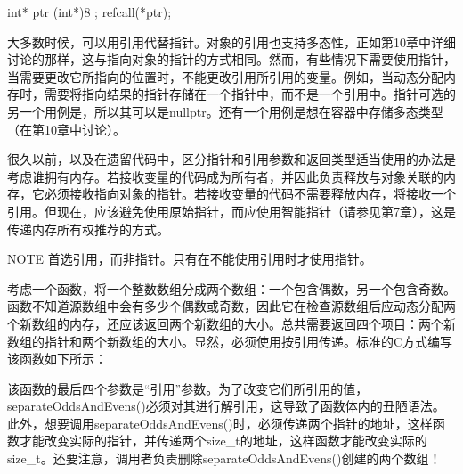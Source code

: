 \begin{cpp}
int* ptr { (int*)8 };
refcall(*ptr);
\end{cpp}

大多数时候，可以用引用代替指针。对象的引用也支持多态性，正如第10章中详细讨论的那样，这与指向对象的指针的方式相同。然而，有些情况下需要使用指针，当需要更改它所指向的位置时，不能更改引用所引用的变量。例如，当动态分配内存时，需要将指向结果的指针存储在一个指针中，而不是一个引用中。指针可选的另一个用例是，所以其可以是nullptr。还有一个用例是想在容器中存储多态类型（在第10章中讨论）。

很久以前，以及在遗留代码中，区分指针和引用参数和返回类型适当使用的办法是考虑谁拥有内存。若接收变量的代码成为所有者，并因此负责释放与对象关联的内存，它必须接收指向对象的指针。若接收变量的代码不需要释放内存，将接收一个引用。但现在，应该避免使用原始指针，而应使用智能指针（请参见第7章），这是传递内存所有权推荐的方式。

\begin{myNotic}{NOTE}
首选引用，而非指针。只有在不能使用引用时才使用指针。
\end{myNotic}

考虑一个函数，将一个整数数组分成两个数组：一个包含偶数，另一个包含奇数。函数不知道源数组中会有多少个偶数或奇数，因此它在检查源数组后应动态分配两个新数组的内存，还应该返回两个新数组的大小。总共需要返回四个项目：两个新数组的指针和两个新数组的大小。显然，必须使用按引用传递。标准的C方式编写该函数如下所示：


该函数的最后四个参数是“引用”参数。为了改变它们所引用的值，separateOddsAndEvens()必须对其进行解引用，这导致了函数体内的丑陋语法。此外，想要调用separateOddsAndEvens()时，必须传递两个指针的地址，这样函数才能改变实际的指针，并传递两个size\_t的地址，这样函数才能改变实际的size\_t。还要注意，调用者负责删除separateOddsAndEvens()创建的两个数组！

